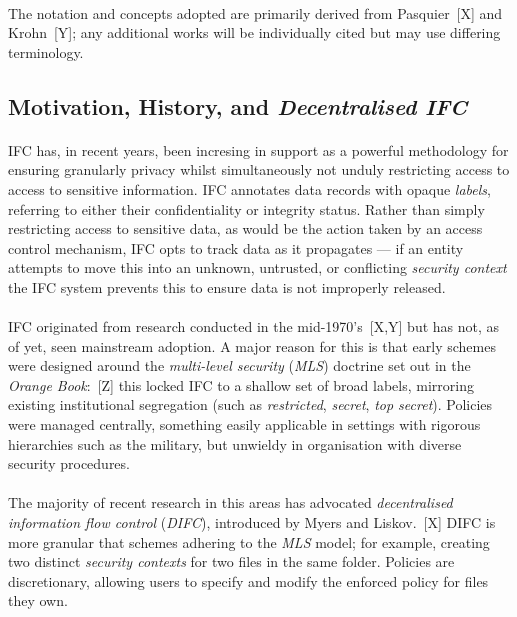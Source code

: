 \paragraph{} The notation and concepts adopted are primarily derived from Pasquier~[X] and Krohn~[Y]; any additional works will be individually cited but may use differing terminology.

\subsection{Motivation, History, and \textit{Decentralised IFC}}

\paragraph{} IFC has, in recent years, been incresing in support as a powerful methodology for ensuring granularly privacy whilst simultaneously not unduly restricting access to access to sensitive information. IFC annotates data records with opaque \textit{labels}, referring to either their confidentiality or integrity status. Rather than simply restricting access to sensitive data, as would be the action taken by an access control mechanism, IFC opts to track data as it propagates --- if an entity attempts to move this into an unknown, untrusted, or conflicting \textit{security context} the IFC system prevents this to ensure data is not improperly released.

\paragraph{} IFC originated from research conducted in the mid-1970's~[X,Y] but has not, as of yet, seen mainstream adoption. A major reason for this is that early schemes were designed around the \textit{multi-level security} (\textit{MLS}) doctrine set out in the \textit{Orange Book}:~[Z] this locked IFC to a shallow set of broad labels, mirroring existing institutional segregation (such as \textit{restricted}, \textit{secret}, \textit{top secret}). Policies were managed centrally, something easily applicable in settings with rigorous hierarchies such as the military, but unwieldy in organisation with diverse security procedures.

\paragraph{} The majority of recent research in this areas has advocated \textit{decentralised information flow control} 
(\textit{DIFC}), introduced by Myers and Liskov.~[X] DIFC is more granular that schemes adhering to the \textit{MLS} model; for example, creating two distinct \textit{security contexts} for two files in the same folder. Policies are discretionary, allowing users to specify and modify the enforced policy for files they own.

